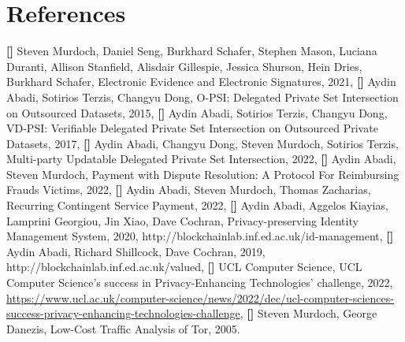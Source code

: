 




\section*{References}


%
\textbf{[\y]} Steven Murdoch, Daniel Seng, Burkhard Schafer, Stephen Mason, Luciana Duranti, Allison Stanfield, Alisdair Gillespie,  Jessica Shurson, Hein Dries, Burkhard Schafer, Electronic Evidence and Electronic Signatures, 2021, \textbf{[\y]} Aydin Abadi, Sotirios Terzis, Changyu Dong, O-PSI: Delegated Private Set Intersection on Outsourced Datasets, 2015, \textbf{[\y]} Aydin Abadi, Sotirios Terzis, Changyu Dong, VD-PSI: Verifiable Delegated Private Set Intersection on Outsourced Private Datasets, 2017, \textbf{[\y]} Aydin Abadi, Changyu Dong, Steven Murdoch, Sotirios Terzis, Multi-party Updatable Delegated Private Set Intersection, 2022, \textbf{[\y]} Aydin Abadi, Steven Murdoch, Payment with Dispute Resolution:
A Protocol For Reimbursing Frauds Victims, 2022, \textbf{[\y]} Aydin Abadi, Steven Murdoch, Thomas Zacharias, Recurring Contingent Service Payment, 2022, \textbf{[\y]} Aydin Abadi, Aggelos Kiayias, Lamprini Georgiou, Jin Xiao, Dave Cochran, Privacy-preserving Identity Management System, 2020, http://blockchainlab.inf.ed.ac.uk/id-management, \textbf{[\y]} Aydin Abadi, Richard Shillcock, Dave Cochran, 2019, http://blockchainlab.inf.ed.ac.uk/valued, \textbf{[\y]} UCL Computer Science, UCL Computer Science's success in Privacy-Enhancing Technologies' challenge, 2022, \href{https://www.ucl.ac.uk/computer-science/news/2022/dec/ucl-computer-sciences-success-privacy-enhancing-technologies-challenge}{https://www.ucl.ac.uk/computer-science/news/2022/dec/ucl-computer-sciences-success-privacy-enhancing-technologies-challenge}, \textbf{[\y]} Steven Murdoch, George Danezis, Low-Cost Traffic Analysis of Tor, 2005.  





